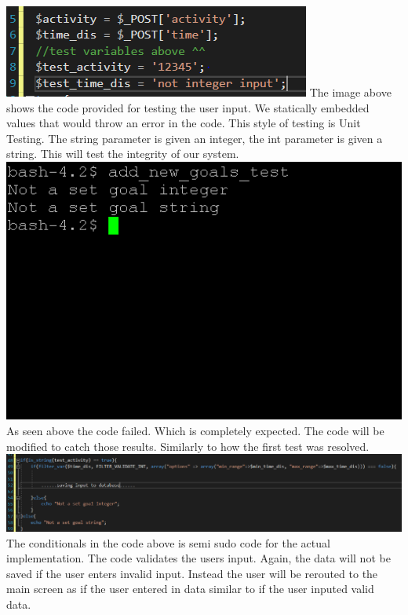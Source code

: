 \documentclass[a4paper]{article}
\begin{document}
\newline
\newline
\includegraphics[width=\textwidth]{test3.PNG}
\newline
\newline
The image above shows the code provided for testing the user input. We statically embedded values that would throw an error in the code. This style of testing is Unit Testing. The string parameter is given an integer, the int parameter is given a string. This will test the integrity of our system. 
\newline
\newline
\includegraphics[width=\textwidth]{test6.PNG}
\newline
\newline
As seen above the code failed. Which is completely expected. The code will be modified to catch those results. Similarly to how the first test was resolved. 
\newline
\newline
\includegraphics[width=\textwidth]{test4.PNG}
\newline
\newline
The conditionals in the code above is semi sudo code for the actual implementation. The code validates the users input. Again, the data will not be saved if the user enters invalid input. Instead the user will be rerouted to the main screen as if the user entered in data similar to if the user inputed valid data. 
\end{document}
